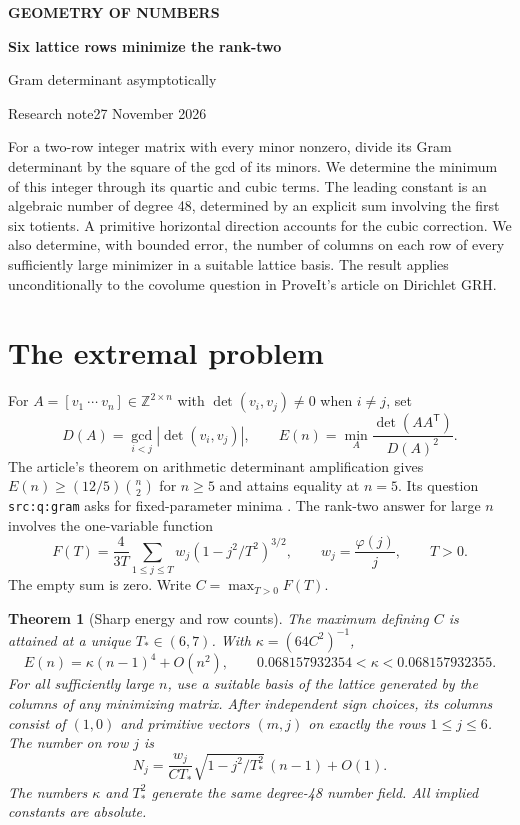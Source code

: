 \documentclass[11pt]{article}
\newtheorem{theorem}{Theorem}\newtheorem{lemma}[theorem]{Lemma}\newtheorem{corollary}[theorem]{Corollary}
\newcommand{\Z}{\mathbb Z}\newcommand{\R}{\mathbb R}\newcommand{\E}{\mathcal E}
\newcommand{\tp}{T_{\!*}}\newcommand{\rank}{\operatorname{rank}}
\begin{document}
\thispagestyle{plain}
{\sffamily\small\bfseries\color{teal} GEOMETRY OF NUMBERS}\par\vspace{6pt}
{\LARGE\bfseries\color{ink} Six lattice rows minimize the rank-two\par Gram determinant asymptotically}\par\vspace{7pt}
{\small Research note\hfill 27 November 2026}\par\vspace{10pt}
\noindent
For a two-row integer matrix with every minor nonzero, divide its Gram determinant by the square of the gcd of its minors. We determine the minimum of this integer through its quartic and cubic terms. The leading constant is an algebraic number of degree 48, determined by an explicit sum involving the first six totients. A primitive horizontal direction accounts for the cubic correction. We also determine, with bounded error, the number of columns on each row of every sufficiently large minimizer in a suitable lattice basis. The result applies unconditionally to the covolume question in ProveIt's article on Dirichlet GRH.

\section{The extremal problem}
For $A=[v_1\ \cdots\ v_n]\in\Z^{2\times n}$ with $\det(v_i,v_j)\ne0$ when $i\ne j$, set
\[
 D(A)=\gcd_{i<j}|\det(v_i,v_j)|,\qquad
 E(n)=\min_A \frac{\det(AA^{\mathsf T})}{D(A)^2}.
\]
The article's theorem on arithmetic determinant amplification gives $E(n)\ge(12/5)\binom n2$ for $n\ge5$ and attains equality at $n=5$. Its question \texttt{src:q:gram} asks for fixed-parameter minima \cite{source}. The rank-two answer for large $n$ involves the one-variable function
\begin{equation}
 F(T)=\frac{4}{3T}\sum_{1\le j\le T} w_j(1-j^2/T^2)^{3/2},\qquad
 w_j=\frac{\varphi(j)}j,\qquad T>0. \label{eq:F}
\end{equation}
The empty sum is zero. Write $C=\max_{T>0}F(T)$.

\begin{theorem}[Sharp energy and row counts]\label{th:main}
The maximum defining $C$ is attained at a unique $\tp\in(6,7)$. With $\kappa=(64C^2)^{-1}$,
\begin{equation}
 E(n)=\kappa(n-1)^4+O(n^2),\qquad
 0.068157932354<\kappa<0.068157932355.\label{eq:E}
\end{equation}
For all sufficiently large $n$, use a suitable basis of the lattice generated by the columns of any minimizing matrix. After independent sign choices, its columns consist of $(1,0)$ and primitive vectors $(m,j)$ on exactly the rows $1\le j\le6$. The number on row $j$ is
\begin{equation}
 N_j=\frac{w_j}{C\tp}\sqrt{1-j^2/\tp^2}\,(n-1)+O(1).\label{eq:Nj}
\end{equation}
The numbers $\kappa$ and $\tp^2$ generate the same degree-48 number field. All implied constants are absolute.
\end{theorem}
\end{document}
